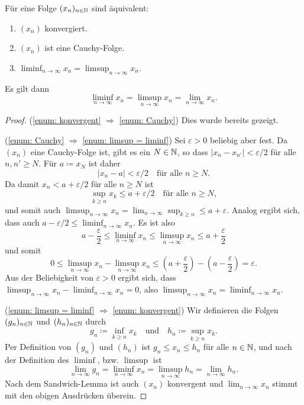 \documentclass[a4paper,10pt]{article}
\begin{document}
\begin{prop}
 Für eine Folge $(x_n)_{n \in \mathbb{N}}$ sind äquivalent:
 \begin{enumerate}
  \item\label{enum: konvergent}
   $(x_n)$ konvergiert.
  \item\label{enum: Cauchy}
   $(x_n)$ ist eine Cauchy-Folge.
  \item\label{enum: limsup = liminf}
   $\liminf_{n \to \infty} x_n = \limsup_{n \to \infty} x_n$.
 \end{enumerate}
 Es gilt dann
 \[
  \liminf_{n \to \infty} x_n = \limsup_{n \to \infty} x_n = \lim_{n \to \infty} x_n.
 \]
\end{prop}
\begin{proof}
 (\ref{enum: konvergent} $\Rightarrow$ \ref{enum: Cauchy}) Dies wurde bereits gezeigt.
 
 (\ref{enum: Cauchy} $\Rightarrow$ \ref{enum: limsup = liminf}) Sei $\varepsilon > 0$ beliebig aber fest. Da $(x_n)$ eine Cauchy-Folge ist, gibt es ein $N \in \mathbb{N}$, so dass $|x_n - x_{n'}| < \varepsilon/2$ für alle $n, n' \geq N$. Für $a \coloneqq x_N$ ist daher
 \[
  |x_n - a| < \varepsilon/2 \quad \text{für alle $n \geq N$}.
 \]
 Da damit $x_n < a + \varepsilon/2$ für alle $n \geq N$ ist
 \[
  \sup_{k \geq n} x_k \leq a + \varepsilon/2 \quad \text{für alle $n \geq N$},
 \]
 und somit auch $\limsup_{n \to \infty} x_n = \lim_{n \to \infty} \sup_{k \geq n} \leq a + \varepsilon$. Analog ergibt sich, dass auch $a-\varepsilon/2 \leq \liminf_{n \to \infty} x_n$. Es ist also
 \[
  a - \frac{\varepsilon}{2}
  \leq \liminf_{n \to \infty} x_n
  \leq \limsup_{n \to \infty} x_n
  \leq a + \frac{\varepsilon}{2}
 \]
 und somit
 \[
  0
  \leq \limsup_{n \to \infty} x_n - \limsup_{n \to \infty} x_n
  \leq \left(a + \frac{\varepsilon}{2}\right) - \left(a - \frac{\varepsilon}{2}\right)
  = \varepsilon.
 \]
 Aus der Beliebigkeit von $\varepsilon > 0$ ergibt sich, dass $\limsup_{n \to \infty} x_n - \liminf_{n \to \infty} x_n = 0$, also $\limsup_{n \to \infty} x_n = \liminf_{n \to \infty} x_n$.
 
 (\ref{enum: limsup = liminf} $\Rightarrow$ \ref{enum: konvergent}) Wir definieren die Folgen $(g_n)_{n \in \mathbb{N}}$ und $(h_n)_{n \in \mathbb{N}}$ durch
 \[
  g_n \coloneqq \inf_{k \geq n} x_k \quad \text{und} \quad h_n \coloneqq \sup_{k \geq n} x_k.
 \]
 Per Definition von $(g_n)$ und $(h_n)$ ist $g_n \leq x_n \leq h_n$ für alle $n \in \mathbb{N}$, und nach der Definition des $\liminf$, bzw. $\limsup$ ist
 \[
 \lim_{n \to \infty} g_n = \liminf_{n \to \infty} x_n = \limsup_{n \to \infty} h_n = \lim_{n \to \infty} h_n.
 \]
 Nach dem Sandwich-Lemma ist auch $(x_n)$ konvergent und $\lim_{n \to \infty} x_n$ stimmt mit den obigen Ausdrücken überein.
\end{proof}
\end{document}
